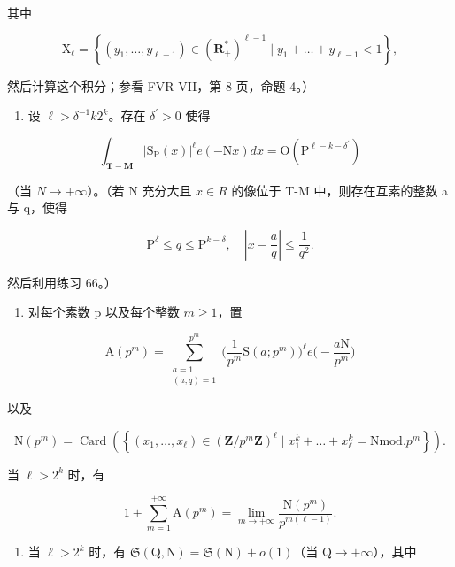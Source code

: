 其中

\[
\mathrm{X} _ {\ell} = \left\{\left(y _ {1}, \dots , y _ {\ell - 1}\right) \in \left(\mathbf {R} _ {+} ^ {*}\right) ^ {\ell - 1} \mid y _ {1} + \dots + y _ {\ell - 1} <   1 \right\},
\]

然后计算这个积分；参看 FVR VII，第 8 页，命题 4。）

\begin{enumerate}
\def\labelenumi{\alph{enumi})}
\setcounter{enumi}{4}
\tightlist
\item
  设 \(\ell >\delta^{-1}k2^{k}\)。存在 \(\delta^{\prime} > 0\) 使得
\end{enumerate}

\[
\int_ {\mathbf {T - M}} | \mathrm{S} _ {\mathrm{P}} (x) | ^ {\ell} e (- \mathrm{N} x) d x = \mathrm{O} (\mathrm{P} ^ {\ell - k - \delta^ {\prime}})
\]

（当 \(N \rightarrow +\infty\)）。（若 N 充分大且 \(x \in R\) 的像位于 T-M 中，则存在互素的整数 a 与 q，使得

\[
\mathrm{P} ^ {\delta} \leqslant q \leqslant \mathrm{P} ^ {k - \delta}, \quad \left| x - \frac {a}{q} \right| \leqslant \frac {1}{q ^ {2}}.
\]

然后利用练习 66。）

\begin{enumerate}
\def\labelenumi{\alph{enumi})}
\setcounter{enumi}{5}
\tightlist
\item
  对每个素数 p 以及每个整数 \(m \geqslant 1\)，置
\end{enumerate}

\[
\mathrm{A}(p^{m}) = \sum_{\substack{a = 1\\ (a,q) = 1}}^{p^{m}}\Big(\frac{1}{p^{m}}\mathrm{S}(a;p^{m})\Big)^{\ell}e\Big(-\frac{a\mathrm{N}}{p^{m}}\Big)
\]

以及

\[
\mathrm{N} (p ^ {m}) = \operatorname{Card} \left(\left\{\left(x _ {1}, \dots , x _ {\ell}\right) \in (\mathbf {Z} / p ^ {m} \mathbf {Z}) ^ {\ell} \mid x _ {1} ^ {k} + \dots + x _ {\ell} ^ {k} = \mathrm{N mod.} p ^ {m} \right\}\right).
\]

当 \(\ell > 2^k\) 时，有

\[
1 + \sum_ {m = 1} ^ {+ \infty} \mathrm{A} (p ^ {m}) = \lim _ {m \to + \infty} \frac {\mathrm{N} (p ^ {m})}{p ^ {m (\ell - 1)}}.
\]

\begin{enumerate}
\def\labelenumi{\alph{enumi})}
\setcounter{enumi}{6}
\tightlist
\item
  当 \(\ell > 2^k\) 时，有 \(\mathfrak{S}(\mathrm{Q}, \mathrm{N}) = \mathfrak{S}(\mathrm{N}) + o(1)\)（当 \(\mathrm{Q} \to +\infty\)），其中
\end{enumerate}

